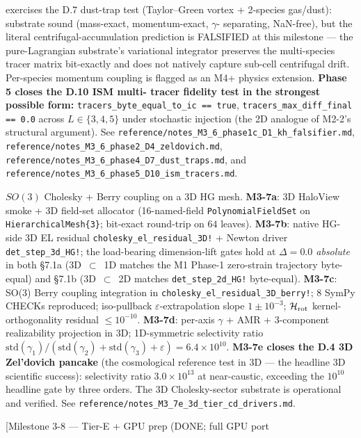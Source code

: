 \documentclass[11pt]{article}
\begin{document}
\begin{description}
{exercises the D.7 dust-trap test} (Taylor--Green vortex + 2-species
gas/dust): substrate sound (mass-exact, momentum-exact, $\gamma$-
separating, NaN-free), but the literal centrifugal-accumulation
prediction is FALSIFIED at this milestone --- the pure-Lagrangian
substrate's variational integrator preserves the multi-species
tracer matrix bit-exactly and does not natively capture sub-cell
centrifugal drift. Per-species momentum coupling is flagged as an
M4+ physics extension. \textbf{Phase 5 closes the D.10 ISM multi-
tracer fidelity test in the strongest possible form:}
\texttt{tracers\_byte\_equal\_to\_ic == true},
\texttt{tracers\_max\_diff\_final == 0.0} across $L \in \{3, 4, 5\}$
under stochastic injection (the 2D analogue of M2-2's structural
argument). See \verb|reference/notes_M3_6_phase1c_D1_kh_falsifier.md|,
\verb|reference/notes_M3_6_phase2_D4_zeldovich.md|,
\verb|reference/notes_M3_6_phase4_D7_dust_traps.md|, and
\verb|reference/notes_M3_6_phase5_D10_ism_tracers.md|.
\item[Milestone 3-7 --- 3D extension (DONE; sub-phases a--e).]
$SO(3)$ Cholesky + Berry coupling on a 3D HG mesh.
\textbf{M3-7a}: 3D HaloView smoke + 3D field-set allocator
(16-named-field \texttt{PolynomialFieldSet} on
\texttt{HierarchicalMesh\{3\}}; bit-exact round-trip on $64$ leaves).
\textbf{M3-7b}: native HG-side 3D EL residual
\texttt{cholesky\_el\_residual\_3D!} + Newton driver
\texttt{det\_step\_3d\_HG!}; the load-bearing dimension-lift gates
hold at \emph{$\Delta = 0.0$ absolute} in both \S{}7.1a (3D~$\subset$~1D
matches the M1 Phase-1 zero-strain trajectory byte-equal) and
\S{}7.1b (3D~$\subset$~2D matches \texttt{det\_step\_2d\_HG!}
byte-equal). \textbf{M3-7c}: SO(3) Berry coupling integration in
\texttt{cholesky\_el\_residual\_3D\_berry!}; 8 SymPy CHECKs
reproduced; iso-pullback $\varepsilon$-extrapolation slope
$1 \pm 10^{-3}$; $\mathcal H_{\rm rot}$ kernel-orthogonality residual
$\le 10^{-10}$. \textbf{M3-7d}: per-axis $\gamma$ + AMR + 3-component
realizability projection in 3D; 1D-symmetric selectivity ratio
$\mathrm{std}(\gamma_1)/(\mathrm{std}(\gamma_2)+\mathrm{std}
(\gamma_3)+\varepsilon) = 6.4\times 10^{10}$. \textbf{M3-7e closes
the D.4 3D Zel'dovich pancake} (the cosmological reference test in
3D --- the headline 3D scientific success): selectivity ratio
$3.0\times 10^{13}$ at near-caustic, exceeding the $10^{10}$
headline gate by three orders. The 3D Cholesky-sector substrate is
operational and verified. See
\verb|reference/notes_M3_7e_3d_tier_cd_drivers.md|.
\item[Milestone 3-8 --- Tier-E + GPU prep (DONE; full GPU port

\end{description}
\end{document}
